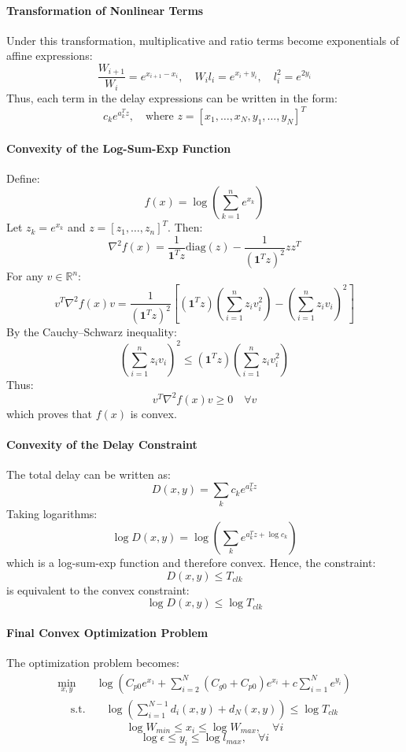 \documentclass{article}
\begin{document}
\paragraph{Transformation of Nonlinear Terms}
Under this transformation, multiplicative and ratio terms become exponentials of affine expressions:
\[
	\frac{W_{i+1}}{W_i} = e^{x_{i+1}-x_i}, \quad
	W_i l_i = e^{x_i+y_i}, \quad
	l_i^2 = e^{2y_i}
\]
Thus, each term in the delay expressions can be written in the form:
\[ c_k e^{a_k^T z}, \quad \text{where } z = [x_1, \dots, x_N, y_1, \dots, y_N]^T \]

\paragraph{Convexity of the Log-Sum-Exp Function}
Define:
\[ f(x) = \log \left( \sum_{k=1}^{n} e^{x_k} \right) \]
Let $z_k = e^{x_k}$ and $z = [z_1, \dots, z_n]^T$. Then:
\[ \nabla^2 f(x) = \frac{1}{\mathbf{1}^T z} \mathrm{diag}(z) - \frac{1}{(\mathbf{1}^T z)^2} zz^T \]
For any $v \in \mathbb{R}^n$:
\[
	v^T \nabla^2 f(x) v
	= \frac{1}{(\mathbf{1}^T z)^2}
	\left[
		(\mathbf{1}^T z)\left(\sum_{i=1}^n z_i v_i^2\right)
		- \left(\sum_{i=1}^n z_i v_i\right)^2
		\right]
\]
By the Cauchy–Schwarz inequality:
\[ \left(\sum_{i=1}^n z_i v_i\right)^2 \le (\mathbf{1}^T z)\left(\sum_{i=1}^n z_i v_i^2\right) \]
Thus:
\[ v^T \nabla^2 f(x) v \ge 0 \quad \forall v \]
which proves that $f(x)$ is convex.

\paragraph{Convexity of the Delay Constraint}
The total delay can be written as:
\[ D(x,y) = \sum_k c_k e^{a_k^T z} \]
Taking logarithms:
\[ \log D(x,y) = \log \left( \sum_k e^{a_k^T z + \log c_k} \right) \]
which is a log-sum-exp function and therefore convex. Hence, the constraint:
\[ D(x,y) \le T_{clk} \]
is equivalent to the convex constraint:
\[ \log D(x,y) \le \log T_{clk} \]

\paragraph{Final Convex Optimization Problem}
The optimization problem becomes:
\begin{align}
	\min_{x,y} \quad & \log \left(
	C_{p0} e^{x_1} + \sum_{i=2}^{N} (C_{g0}+C_{p0}) e^{x_i}
	+ c \sum_{i=1}^{N} e^{y_i} \right)
\end{align}
\begin{align}
	\text{s.t.} \quad &
	\log \left( \sum_{i=1}^{N-1} d_i(x,y) + d_N(x,y) \right)
	\le \log T_{clk}
\end{align}
\[ \log W_{min} \le x_i \le \log W_{max}, \quad \forall i \]
\[ \log \epsilon \le y_i \le \log l_{max}, \quad \forall i \]
\end{document}
